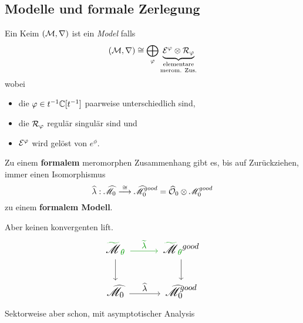 \begin{comment}
  Irregularität von meromorphen Zusammenhängen
  \\\TODO[\cite{sabbah2007isomonodromic}: p. 86]
  \TODO[\cite{sabbah2007isomonodromic}: Def II.2.24]
\end{comment}
\subsection{Modelle und formale Zerlegung}%
\begin{defn}
  Ein Keim $(\mathcal{M},\nabla)$ ist ein \emph{Model} falls
  \[
    (\cM,\nabla)
    \cong
    \bigoplus_\phi
    \underset{\text{merom. Zus.}}{%
      \underset{\text{elementare}}{%
        \underbrace{\cE^\phi\otimes\cR_\phi}
      }
    }
  \]
  wobei
  \begin{itemize}
    \item die $\varphi\in t^{-1}\mathbb{C}[t^{-1}]$ paarweise unterschiedlich sind,
    \item die $\mathcal{R}_\varphi$ regulär singulär sind und
    \item $\mathcal{E}^\varphi$ wird gelöst von $e^\phi$. \TODO[?]
  \end{itemize}
\end{defn}
\begin{comment}
  \begin{lem}
    Ist $(\sM,\nabla)$ ein Modell\TODO[Oder Halm??], so lässt sich die
    Zusammenhangs Matrix schreiben als
    \[
      A^0=dQ+\Lambda\frac{dt}{t}
    \]
    wobei
    \begin{itemize}
      \item $Q=\diag(q_1,\dots,q_n)$ mit $q_i$ meromorph und
      \item $\Lambda$ diagonal und konstant ist.
    \end{itemize}
  \end{lem}
\end{comment}
\begin{paracol}{2}
  \begin{thm}
    Zu einem \textbf{formalem} meromorphen Zusammenhang gibt es, bis auf
    Zurückziehen, immer einen Isomorphismus
    \[
      \widehat\lambda:\widehat{\mathscr{M}}_0
      \overset{\cong}\longrightarrow
      \widehat{\mathscr{M}}_0^{good}
      =\widehat{\mathcal{O}}_0\otimes\mathscr{M}_0^{good}
    \]
    zu einem \textbf{formalem Modell}.
  \end{thm}
\switchcolumn
  \begin{rem}
    Aber keinen konvergenten lift.
    \[ \Large\begin{tikzcd}
        \textcolor{green!60!black}{\tilde{\textcolor{black}{\sM}}_{\theta}}\dar
        \rar[green!60!black]{\tilde\lambda}&
        \textcolor{green!60!black}{%
          \tilde{\textcolor{black}{\sM}}_{\theta}}^{good} \dar
        \\\hat\sM_0 \rar{\hat\lambda} &
        \hat\sM_0^{good}
    \end{tikzcd} \]
    \textcolor{green!60!black}{Sektorweise aber schon, mit asymptotischer
    Analysis}
  \end{rem}
\end{paracol}

